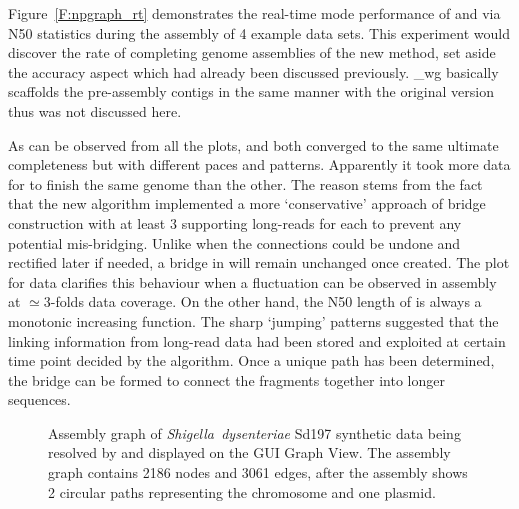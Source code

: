 Figure~\ref{F:npgraph_rt} demonstrates the real-time mode performance of \npscarf{} and \npgraph{} via N50 statistics during the assembly of 4 example data sets.
This experiment would discover the rate of completing genome assemblies of the new method, set aside the accuracy aspect which had already been discussed previously.
\npscarf{}\_wg basically scaffolds the pre-assembly contigs in the same manner with the original version thus was not discussed here.

As can be observed from all the plots, \npgraph{} and \npscarf{} both converged to the same ultimate completeness but with different paces and patterns.
Apparently it took more data for \npgraph{} to finish the same genome than the other.
The reason stems from the fact that the new algorithm implemented a more `conservative' approach of bridge construction with at least 3 supporting long-reads for each to prevent any potential mis-bridging. 
Unlike \npscarf{} when the connections could be undone and rectified later if needed, a bridge in \npgraph{} will remain unchanged once created.
The plot for \ec{} data clarifies this behaviour when a fluctuation can be observed in \npscarf{} assembly at $\simeq 3$-folds data coverage.
On the other hand, the N50 length of \npgraph{} is always a monotonic increasing function. 
The sharp `jumping' patterns suggested that the linking information from long-read data had been stored and exploited at certain time point decided by the algorithm.
Once a unique path has been determined, the bridge can be formed to connect the fragments together into longer sequences.


\begin{figure}[!hpt]
\centering
{}
\hfill
{}
\caption[Assembly graph resolving on \npgraph{} Graph View]{Assembly graph of \emph{Shigella~dysenteriae} Sd197 synthetic data being resolved by \npgraph{} and displayed on the GUI Graph View. The \spades{} assembly graph contains 2186 nodes and 3061 edges, after the assembly shows 2 circular paths representing the chromosome and one plasmid.}
\label{F:npgraph_graphview}
\end{figure}

